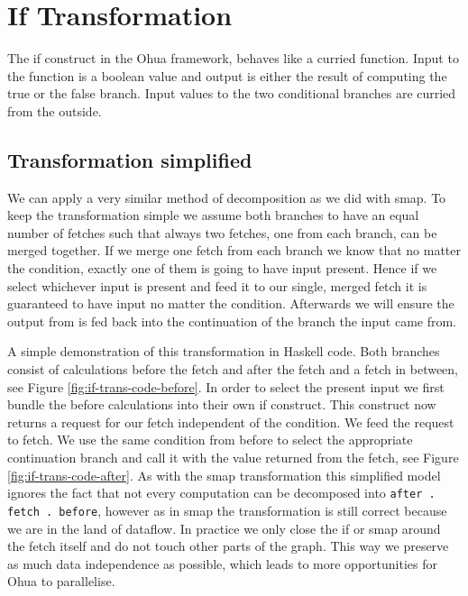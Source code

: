 \chapter{If Transformation}

\label{ch:if-transformation}

\newcommand{\opite}{\texttt{ifThenElse}}
\newcommand{\opselect}{\texttt{select}}

The if construct in the Ohua framework, behaves like a curried function.
Input to the function is a boolean value and output is either the result of computing the true or the false branch.
Input values to the two conditional branches are curried from the outside.

\section{Transformation simplified}

We can apply a very similar method of decomposition as we did with smap.
To keep the transformation simple we assume both branches to have an equal number of fetches such that always two fetches, one from each branch, can be merged together.
If we merge one fetch from each branch we know that no matter the condition, exactly one of them is going to have input present.
Hence if we select whichever input is present and feed it to our single, merged fetch it is guaranteed to have input no matter the condition.
Afterwards we will ensure the output from \fetch{} is fed back into the continuation of the branch the input came from.

A simple demonstration of this transformation in Haskell code.
Both branches consist of calculations before the fetch and after the fetch and a fetch in between, see Figure \ref{fig:if-trans-code-before}.
In order to select the present input we first bundle the before calculations into their own if construct.
This construct now returns a request for our fetch independent of the condition.
We feed the request to fetch.
We use the same condition from before to select the appropriate continuation branch and call it with the value returned from the fetch, see Figure \ref{fig:if-trans-code-after}.
As with the smap transformation this simplified model ignores the fact that not every computation can be decomposed into \texttt{after . fetch . before}, however as in smap the transformation is still correct because we are in the land of dataflow.
In practice we only close the if or smap around the fetch itself and do not touch other parts of the graph.
This way we preserve as much data independence as possible, which leads to more opportunities for Ohua to parallelise.

